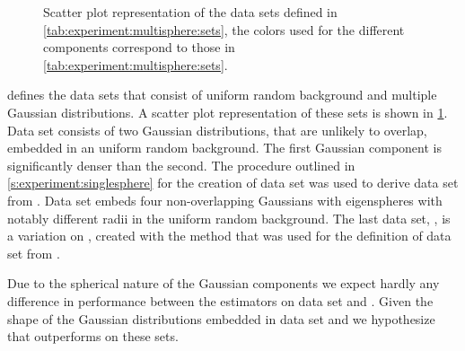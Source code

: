 
\begin{figure}[b]
	\centering
	
	\caption{Scatter plot representation of the data sets defined in \cref{tab:experiment:multisphere:sets}, the colors used for the different components correspond to those in \cref{tab:experiment:multisphere:sets}.}
	\label{fig:experiment:multisphere:sets}
\end{figure}

 defines the data sets that consist of uniform random background and multiple Gaussian distributions. A scatter plot representation of these sets is shown in \cref{fig:experiment:multisphere:sets}.
	Data set \ferdosiTwo consists of two Gaussian distributions, that are unlikely to overlap, embedded in an uniform random background. The first Gaussian component is significantly denser than the second.
	The procedure outlined in \cref{s:experiment:singlesphere} for the creation of data set \baakmanOne was used to derive data set \baakmanTwo from \ferdosiTwo.
	Data set \ferdosiThree embeds four non-overlapping Gaussians with eigenspheres with notably different radii in the uniform random background.
	The last data set, \baakmanThree, is a variation on \ferdosiThree, created with the method that was used for the definition of data set \baakmanOne from \ferdosiOne.

	Due to the spherical nature of the Gaussian components we expect hardly any difference in performance between the estimators on data set \ferdosiTwo and \ferdosiThree. Given the shape of the Gaussian distributions embedded in data set \baakmanTwo and \baakmanThree we hypothesize that \sambe outperforms \mbe on these sets.
